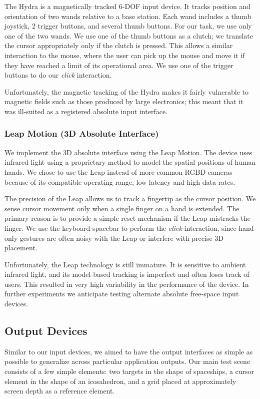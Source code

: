 The Hydra is a magnetically tracked 6-DOF input device. It tracks position and
orientation of two wands relative to a base station. Each wand includes a thumb
joystick, 2 trigger buttons, and several thumb buttons. For our task, we use
only one of the two wands. We use one of the thumb buttons as a clutch; we
translate the cursor appropriately only if the clutch is pressed. This allows a
similar interaction to the mouse, where the user can pick up the mouse and move
it if they have reached a limit of its operational area. We use one of the
trigger buttons to do our {\it click} interaction.

Unfortunately, the magnetic tracking of the Hydra makes it fairly vulnerable to
magnetic fields such as those produced by large electronics; this meant that it
was ill-suited as a registered absolute input interface.

\subsubsection{Leap Motion (3D Absolute Interface)}
We implement the 3D absolute interface using the Leap Motion. The device uses
infrared light using a proprietary method to model the spatial positions of
human hands. We chose to use the Leap instead of more common RGBD cameras
because of its compatible operating range, low latency and high data rates.

The precision of the Leap allows us to track a fingertip as the cursor
position.  We sense cursor movement only when a single finger on a hand is
extended. The primary reason is to provide a simple reset mechanism if the
Leap mistracks the finger. We use the keyboard spacebar to perform the
{\it click} interaction, since hand-only gestures are often noisy with the Leap
or interfere with precise 3D placement.

Unfortunately, the Leap technology is still immature. It is sensitive to
ambient infrared light, and its model-based tracking is imperfect and often
loses track of users. This resulted in very high variability in the
performance of the device. In further experiments we anticipate testing
alternate absolute free-space input devices.

\subsection{Output Devices}
Similar to our input devices, we aimed to have the output interfaces as simple
as possible to generalize across particular application outputs. Our main test
scene consists of a few simple elements: two targets in the shape of
spaceships, a cursor element in the shape of an icosahedron, and a grid placed
at approximately screen depth as a reference element.

